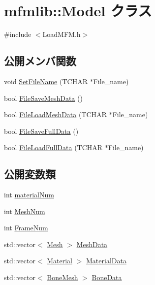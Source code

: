 \hypertarget{classmfmlib_1_1_model}{}\section{mfmlib\+:\+:Model クラス}
\label{classmfmlib_1_1_model}


{\ttfamily \#include $<$Load\+M\+F\+M.\+h$>$}

\subsection*{公開メンバ関数}
\begin{DoxyCompactItemize}
\item 
void \mbox{\hyperlink{classmfmlib_1_1_model_a56abf4bae21e85d159a306aaac20e851}{Set\+File\+Name}} (T\+C\+H\+AR $\ast$File\+\_\+name)
\item 
bool \mbox{\hyperlink{classmfmlib_1_1_model_a27950e34a457b62b0d6474cd8f7017aa}{File\+Save\+Mesh\+Data}} ()
\item 
bool \mbox{\hyperlink{classmfmlib_1_1_model_a906eb59ce0373f757c5473512e95c5a4}{File\+Load\+Mesh\+Data}} (T\+C\+H\+AR $\ast$File\+\_\+name)
\item 
bool \mbox{\hyperlink{classmfmlib_1_1_model_a78ed7288a1add6c6140b50f361102374}{File\+Save\+Full\+Data}} ()
\item 
bool \mbox{\hyperlink{classmfmlib_1_1_model_a0b260e285347695a8a9f0092b57ddb7f}{File\+Load\+Full\+Data}} (T\+C\+H\+AR $\ast$File\+\_\+name)
\end{DoxyCompactItemize}
\subsection*{公開変数類}
\begin{DoxyCompactItemize}
\item 
int \mbox{\hyperlink{classmfmlib_1_1_model_a0a25d19e204a8075af58d3cf84c9446e}{material\+Num}}
\item 
int \mbox{\hyperlink{classmfmlib_1_1_model_ab810627ca36c30ef29d787ca5b81d7ba}{Mesh\+Num}}
\item 
int \mbox{\hyperlink{classmfmlib_1_1_model_a3ad1641bef61a820154ac7e9d7806f52}{Frame\+Num}}
\item 
std\+::vector$<$ \mbox{\hyperlink{classmfmlib_1_1_mesh}{Mesh}} $>$ \mbox{\hyperlink{classmfmlib_1_1_model_a77fc5611ec675c619d1082d0f7a966d2}{Mesh\+Data}}
\item 
std\+::vector$<$ \mbox{\hyperlink{structmfmlib_1_1_material}{Material}} $>$ \mbox{\hyperlink{classmfmlib_1_1_model_ab9e64c1b2c11cdc0bf8844ee076d2f78}{Material\+Data}}
\item 
std\+::vector$<$ \mbox{\hyperlink{classmfmlib_1_1_bone_mesh}{Bone\+Mesh}} $>$ \mbox{\hyperlink{classmfmlib_1_1_model_a54babd8cc910d4f54935b75bcaf81023}{Bone\+Data}}
\end{DoxyCompactItemize}


